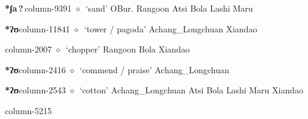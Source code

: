   \item {\footnotesize \textbf{*ʃa\,?\,}}{\tiny column-9391}
         $\diamond$~`sand'
         OBur. 
\hspace{1ex}
         Rangoon 
\hspace{1ex}
         Atsi 
\hspace{1ex}
         Bola 
\hspace{1ex}
         Lashi 
\hspace{1ex}
         Maru 
  \item {\footnotesize \textbf{*ʔʊ}}{\tiny column-11841}
         $\diamond$~`tower / pagoda'
         Achang\_Longchuan 
\hspace{1ex}
         Xiandao 
  \item {\footnotesize \textbf{}}{\tiny column-2007}
         $\diamond$~`chopper'
         Rangoon 
\hspace{1ex}
         Bola 
\hspace{1ex}
         Xiandao 
  \item {\footnotesize \textbf{*ʔʊ}}{\tiny column-2416}
         $\diamond$~`commend / praise'
         Achang\_Longchuan 
  \item {\footnotesize \textbf{*ʔʊ}}{\tiny column-2543}
         $\diamond$~`cotton'
         Achang\_Longchuan 
\hspace{1ex}
         Atsi 
\hspace{1ex}
         Bola 
\hspace{1ex}
         Lashi 
\hspace{1ex}
         Maru 
\hspace{1ex}
         Xiandao 
  \item {\footnotesize \textbf{}}{\tiny column-5215}
